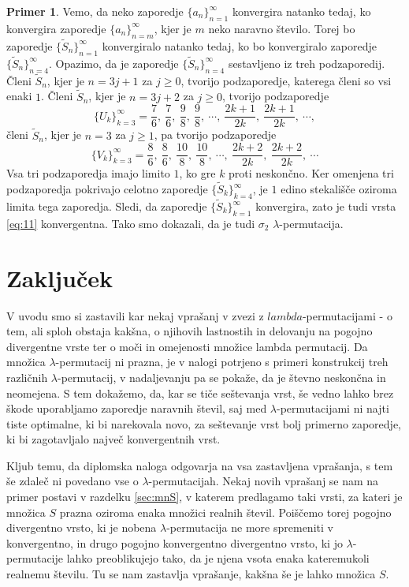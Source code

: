 \documentclass[12pt,a4paper,reqno]{amsart}
\theoremstyle{definition} %
\newtheorem{primer}[definicija]{Primer}
\theoremstyle{plain} %
\begin{document}
\begin{primer}
Vemo, da neko zaporedje $\{a_n\}_{n=1}^{\infty}$ konvergira natanko tedaj, ko konvergira zaporedje $\{a_n\}_{n=m}^{\infty}$, kjer je $m$ neko naravno število. Torej bo zaporedje $\{\tilde{S}_n\}_{n=1}^{\infty}$ konvergiralo natanko tedaj, ko bo konvergiralo zaporedje $\{\tilde{S}_n\}_{n=4}^{\infty}$. Opazimo, da je zaporedje $\{\tilde{S}_n\}_{n=4}^{\infty}$ sestavljeno iz treh podzaporedij. Členi $\tilde{S}_n$, kjer je $n=3j+1$ za $j \geq 0$, tvorijo podzaporedje, katerega členi so vsi enaki $1$. Členi $\tilde{S}_n$, kjer je $n=3j+2$ za $j \geq 0$, tvorijo podzaporedje 
$$\{U_k\}_{k=3}^{\infty}=\frac{7}{6}, \ \frac{7}{6}, \ \frac{9}{8}, \ \frac{9}{8}, \ \cdots, \ \frac{2k+1}{2k}, \ \frac{2k+1}{2k}, \ \cdots,$$
členi $\tilde{S}_n$, kjer je $n=3$ za $j \geq 1$, pa tvorijo podzaporedje 
$$\{V_k\}_{k=3}^{\infty}=\frac{8}{6}, \ \frac{8}{6}, \ \frac{10}{8}, \ \frac{10}{8}, \ \cdots, \ \frac{2k+2}{2k}, \ \frac{2k+2}{2k}, \ \cdots$$
Vsa tri podzaporedja imajo limito $1$, ko gre $k$ proti neskončno. Ker omenjena tri podzaporedja pokrivajo celotno zaporedje $\{\tilde{S}_k\}_{k=4}^{\infty}$, je $1$ edino stekališče oziroma limita tega zaporedja. Sledi, da zaporedje $\{\tilde{S}_k\}_{k=1}^{\infty}$ konvergira, zato je tudi vrsta \eqref{eq:11} konvergentna.
Tako smo dokazali, da je tudi $\sigma_2$ $\lambda$-permutacija.

\end{primer}

\section{Zaključek}

V uvodu smo si zastavili kar nekaj vprašanj v zvezi z $lambda$-permutacijami - o tem, ali sploh obstaja kakšna, o njihovih lastnostih in delovanju na pogojno divergentne vrste ter o moči in omejenosti množice lambda permutacij. Da množica $\lambda$-permutacij ni prazna, je v nalogi potrjeno s primeri konstrukcij treh različnih $\lambda$-permutacij, v nadaljevanju pa se pokaže, da je števno neskončna in neomejena. S tem dokažemo, da, kar se tiče seštevanja vrst, še vedno lahko brez škode uporabljamo zaporedje naravnih števil, saj med $\lambda$-permutacijami ni najti tiste optimalne, ki bi narekovala novo, za seštevanje vrst bolj primerno zaporedje, ki bi zagotavljalo največ konvergentnih vrst.

Kljub temu, da diplomska naloga odgovarja na vsa zastavljena vprašanja, s tem še zdaleč ni povedano vse o $\lambda$-permutacijah. Nekaj novih vprašanj se nam na primer postavi v razdelku \ref{sec:mnS}, v katerem predlagamo taki vrsti, za kateri je množica $S$ prazna oziroma enaka množici realnih števil. Poiščemo torej pogojno divergentno vrsto, ki je nobena $\lambda$-permutacija ne more spremeniti v konvergentno, in drugo pogojno konvergentno divergentno vrsto, ki jo $\lambda$-permutacije lahko preoblikujejo tako, da je njena vsota enaka kateremukoli realnemu številu. Tu se nam zastavlja vprašanje, kakšna še je lahko množica $S$.
\end{document}
